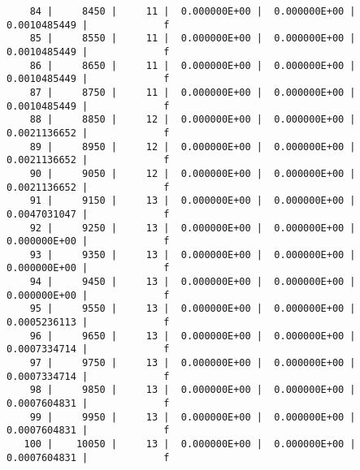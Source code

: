 \documentclass[
  authoryear,
  preprint,
  3p]{elsarticle}
\begin{document}
\begin{verbatim}
    84 |     8450 |     11 |  0.000000E+00 |  0.000000E+00 |  0.0010485449 |             f
    85 |     8550 |     11 |  0.000000E+00 |  0.000000E+00 |  0.0010485449 |             f
    86 |     8650 |     11 |  0.000000E+00 |  0.000000E+00 |  0.0010485449 |             f
    87 |     8750 |     11 |  0.000000E+00 |  0.000000E+00 |  0.0010485449 |             f
    88 |     8850 |     12 |  0.000000E+00 |  0.000000E+00 |  0.0021136652 |             f
    89 |     8950 |     12 |  0.000000E+00 |  0.000000E+00 |  0.0021136652 |             f
    90 |     9050 |     12 |  0.000000E+00 |  0.000000E+00 |  0.0021136652 |             f
    91 |     9150 |     13 |  0.000000E+00 |  0.000000E+00 |  0.0047031047 |             f
    92 |     9250 |     13 |  0.000000E+00 |  0.000000E+00 |  0.000000E+00 |             f
    93 |     9350 |     13 |  0.000000E+00 |  0.000000E+00 |  0.000000E+00 |             f
    94 |     9450 |     13 |  0.000000E+00 |  0.000000E+00 |  0.000000E+00 |             f
    95 |     9550 |     13 |  0.000000E+00 |  0.000000E+00 |  0.0005236113 |             f
    96 |     9650 |     13 |  0.000000E+00 |  0.000000E+00 |  0.0007334714 |             f
    97 |     9750 |     13 |  0.000000E+00 |  0.000000E+00 |  0.0007334714 |             f
    98 |     9850 |     13 |  0.000000E+00 |  0.000000E+00 |  0.0007604831 |             f
    99 |     9950 |     13 |  0.000000E+00 |  0.000000E+00 |  0.0007604831 |             f
   100 |    10050 |     13 |  0.000000E+00 |  0.000000E+00 |  0.0007604831 |             f
\end{verbatim}
\end{document}
